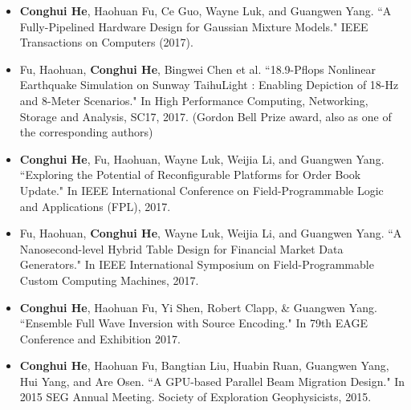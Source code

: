 \documentclass[localFont]{awesome-source-cv} %
\begin{document}

\begin{itemize}
	\item \textbf{Conghui He}, Haohuan Fu, Ce Guo, Wayne Luk, and Guangwen Yang. ``A Fully-Pipelined Hardware Design for Gaussian Mixture Models." IEEE Transactions on Computers (2017). \\
	\vspace{-3.5mm}
	\item Fu, Haohuan, \textbf{Conghui He}, Bingwei Chen et al. ``18.9-Pflops Nonlinear Earthquake Simulation on Sunway TaihuLight : Enabling Depiction of 18-Hz and 8-Meter Scenarios." In High Performance Computing, Networking, Storage and Analysis, SC17, 2017. (Gordon Bell Prize award, also as one of the corresponding authors) \\
	\vspace{-3mm}
	\item \textbf{Conghui He}, Fu, Haohuan, Wayne Luk, Weijia Li, and Guangwen Yang. ``Exploring the Potential of Reconfigurable Platforms for Order Book Update." In IEEE International Conference on Field-Programmable Logic and Applications (FPL), 2017. \\
	\vspace{-3.5mm}
	\item Fu, Haohuan, \textbf{Conghui He}, Wayne Luk, Weijia Li, and Guangwen Yang. ``A Nanosecond-level Hybrid Table Design for Financial Market Data Generators." In IEEE International Symposium on Field-Programmable Custom Computing Machines, 2017. \\
	\vspace{-3.5mm}
	\item \textbf{Conghui He}, Haohuan Fu, Yi Shen, Robert Clapp, \& Guangwen Yang. ``Ensemble Full Wave Inversion with Source Encoding." In 79th EAGE Conference and Exhibition 2017. \\
	\vspace{-3.5mm}
	\item \textbf{Conghui He}, Haohuan Fu, Bangtian Liu, Huabin Ruan, Guangwen Yang, Hui Yang, and Are Osen. ``A GPU-based Parallel Beam Migration Design." In 2015 SEG Annual Meeting. Society of Exploration Geophysicists, 2015.\\

\end{itemize}
\end{document}
